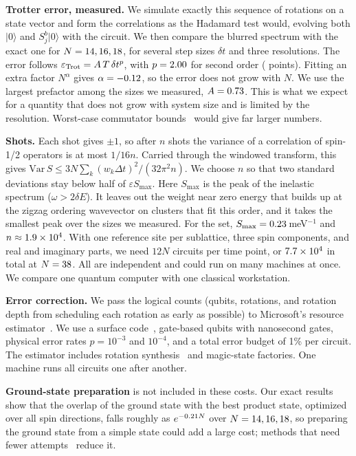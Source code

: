 \documentclass[conference]{IEEEtran}
\newcommand{\eps}{\varepsilon}
\begin{document}
\textbf{Trotter error, measured.} We simulate exactly this sequence of
rotations on a state vector and form the correlations as the Hadamard test
would, evolving both $|0\rangle$ and $S^b_j|0\rangle$ with the circuit. We
then compare the blurred spectrum with the exact one for
$N=14, 16, 18$, for several step sizes $\delta t$ and three
resolutions. The error follows $\eps_{\rm Trot}=A\,T\,\delta t^{p}$, with
$p=2.00$ for second order (\trotNptsWinter{} points). Fitting an
extra factor $N^\alpha$ gives $\alpha=-0.12$, so the error
does not grow with $N$. We use the largest prefactor among the sizes we
measured, $A=0.73$. This is what we expect for a quantity that does
not grow with system size and is limited by the resolution. Worst-case
commutator bounds~\cite{childs2021} would give far larger numbers.

\textbf{Shots.} Each shot gives $\pm1$, so after $n$ shots the variance of a
correlation of spin-1/2 operators is at most $1/16n$. Carried through the
windowed transform, this gives
$\mathrm{Var}\,S\le 3N\sum_k (w_k\Delta t)^2/(32\pi^2 n)$. We choose $n$ so
that two standard deviations stay below half of $\eps S_{\max}$. Here
$S_{\max}$ is the peak of the inelastic spectrum ($\omega>2\delta E$). It
leaves out the weight near zero energy that builds up at the zigzag
ordering wavevector on clusters that fit this order, and it takes the
smallest peak over the sizes we measured. For the \mainSet{} set,
$S_{\max}=0.23$\,meV$^{-1}$ and $n\approx1.9\times10^{4}$. With one
reference site per sublattice, three spin components, and real and
imaginary parts, we need $12N$ circuits per time point, or
$7.7\times10^{4}$ in total at $N=38$. All are independent and
could run on many machines at once. We compare one quantum computer with
one classical workstation.

\textbf{Error correction.} We pass the logical counts (qubits, rotations,
and rotation depth from scheduling each rotation as early as possible) to
Microsoft's resource estimator~\cite{beverland2022}. We use a surface
code~\cite{fowler2012}, gate-based qubits with nanosecond gates, physical
error rates $p=10^{-3}$ and $10^{-4}$, and a total error budget of 1\% per
circuit. The estimator includes rotation synthesis~\cite{ross2016} and
magic-state factories. One machine runs all circuits one after another.

\textbf{Ground-state preparation} is not included in these costs. Our exact
results show that the overlap of the ground state with the best product
state, optimized over all spin directions, falls roughly as
$e^{-0.21 N}$ over $N=14, 16, 18$, so preparing the
ground state from a simple state could add a large cost; methods that need
fewer attempts~\cite{lin2020} reduce it.
\end{document}
